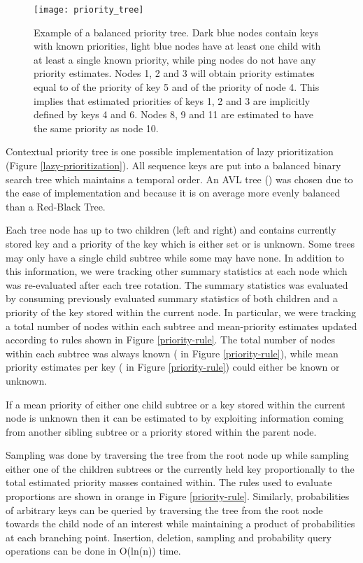\documentclass{article}
\begin{document}
\begin{figure}
\centering
\begin{minipage}{1.0\textwidth}  
  \centering
  \texttt{[image: priority\_tree]}
  \caption{Example of a balanced priority tree. Dark blue nodes contain keys 
    with known priorities, light blue nodes have at least one child with at 
    least a single known priority, while ping nodes do not have any priority 
    estimates. Nodes 1, 2 and 3 will obtain priority estimates equal to  
    of the priority of key 5 and  of the priority of node 4. This implies 
    that estimated priorities of keys 1, 2 and 3 are implicitly defined by keys 
    4 and 6. Nodes 8, 9 and 11 are estimated to have the same priority as node 
    10.}
  \label{priority-tree}
\end{minipage}\end{figure}

Contextual priority tree is one possible implementation of lazy 
prioritization (Figure \ref{lazy-prioritization}). All sequence 
keys are put into a balanced binary search tree which maintains a temporal 
order. An AVL tree (\cite{velskii1976avl}) was chosen due to the ease of 
implementation and because it is on average more evenly balanced than a 
Red-Black Tree.

Each tree node has up to two children (left and right) and contains currently 
stored key 
and a priority of the key which is either set or is unknown. Some trees may 
only 
have a single child subtree while some may have none. In addition to this 
information, we were tracking other summary statistics at each node which was 
re-evaluated after each tree rotation. The summary statistics was evaluated by 
consuming previously evaluated summary statistics of both children and a 
priority of the key stored within the current node. In particular, we were 
tracking a total number of nodes within each subtree and mean-priority 
estimates 
updated according to rules shown in Figure \ref{priority-rule}. The total 
number of 
nodes within each subtree was always known ( in Figure \ref{priority-rule}), 
while mean priority estimates per key ( in Figure \ref{priority-rule}) could 
either be known or unknown. 

If a mean priority of either one child subtree or a key 
stored within the current node is unknown then it can be estimated to by 
exploiting information coming from another sibling subtree or a priority 
stored within the parent node.

Sampling was done by traversing the tree from the root node up while sampling 
either one of the children subtrees or the currently held key proportionally to 
the total estimated priority masses contained within. The rules used to 
evaluate proportions are shown in orange in Figure 
\ref{priority-rule}. Similarly, probabilities of arbitrary keys can be queried 
by traversing the tree from the root node towards the child node of an interest 
while maintaining a product of probabilities at each branching point. 
Insertion, 
deletion, sampling and probability query operations can be done in O(ln(n)) 
time.
\end{document}
